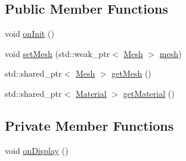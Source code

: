 \subsection*{Public Member Functions}
\begin{DoxyCompactItemize}
\item 
void \hyperlink{classtmsengine_1_1_mesh_renderer_a63ea3f394ba6678a6044068dd4253c97}{on\+Init} ()
\item 
void \hyperlink{classtmsengine_1_1_mesh_renderer_a1f1e2e0502438b6709e27a0b39c5ae9b}{set\+Mesh} (std\+::weak\+\_\+ptr$<$ \hyperlink{class_mesh}{Mesh} $>$ \hyperlink{classtmsengine_1_1_mesh_renderer_a6bc03b9b7e038a6e498fe7d54323d94e}{mesh})
\item 
std\+::shared\+\_\+ptr$<$ \hyperlink{class_mesh}{Mesh} $>$ \hyperlink{classtmsengine_1_1_mesh_renderer_a8f4724f163a3ff6e0eba9508380f79f1}{get\+Mesh} ()
\item 
std\+::shared\+\_\+ptr$<$ \hyperlink{class_material}{Material} $>$ \hyperlink{classtmsengine_1_1_mesh_renderer_a0d609c998a9c37b9282639432b165788}{get\+Material} ()
\end{DoxyCompactItemize}
\subsection*{Private Member Functions}
\begin{DoxyCompactItemize}
\item 
void \hyperlink{classtmsengine_1_1_mesh_renderer_adf77a2164ad1c92e4a310b99624b9fb5}{on\+Display} ()
\end{DoxyCompactItemize}
